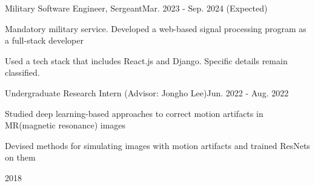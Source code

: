\documentclass{cv}
\begin{document}
{Military Software Engineer, Sergeant}{Mar. 2023 - Sep. 2024 (Expected)}
{
    \item Mandatory military service. Developed a web-based signal processing program as a full-stack developer
    \item Used a tech stack that includes React.js and Django. Specific details remain classified.
}
{Undergraduate Research Intern (Advisor: Jongho Lee)}{Jun. 2022 - Aug. 2022}
{
    \item Studied deep learning-based approaches to correct motion artifacts in MR(magnetic resonance) images
    \item Devised methods for simulating images with motion artifacts and trained ResNets on them
}
\begin{comment}
\cventry{Research \& Education Program (R\&E)}{Korea Science Academy}
{Title: On Wave Propagation in Hyperhelix Structures}{Mar. 2019 - Dec. 2019}
{
    \item Advised by Dr. Yongdeok Kim
    \item Implemented a mechanical wave simulator for curved waveguide using python %
    \item Gave a poster presentation at International Science Youth Forum (ISYF) @ Singapore 2020
}
\end{comment}
 {2018}


\vspace{-4mm}
\vspace{2mm}

\end{document}
